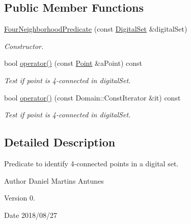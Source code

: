 \subsection*{Public Member Functions}
\begin{DoxyCompactItemize}
\item 
\hyperlink{classDIPaCUS_1_1Neighborhood_1_1FourNeighborhoodPredicate_a97e3418e93f5bb89fcc5fd331c8f6bc6}{Four\+Neighborhood\+Predicate} (const \hyperlink{classDIPaCUS_1_1Neighborhood_1_1FourNeighborhoodPredicate_a9f81af73dae8303b1142e9ca6930c332}{Digital\+Set} \&digital\+Set)
\begin{DoxyCompactList}\small\item\em Constructor. \end{DoxyCompactList}\item 
bool \hyperlink{classDIPaCUS_1_1Neighborhood_1_1FourNeighborhoodPredicate_ab5532db7f4278ee6b107d2ee4eeb385f}{operator()} (const \hyperlink{classDIPaCUS_1_1Neighborhood_1_1FourNeighborhoodPredicate_a5b162b7df8bf69ab1255dbee48de3298}{Point} \&a\+Point) const
\begin{DoxyCompactList}\small\item\em Test if point is 4-\/connected in digital\+Set. \end{DoxyCompactList}\item 
bool \hyperlink{classDIPaCUS_1_1Neighborhood_1_1FourNeighborhoodPredicate_a77275b997027b69409b86cff2bd36279}{operator()} (const Domain\+::\+Const\+Iterator \&it) const
\begin{DoxyCompactList}\small\item\em Test if point is 4-\/connected in digital\+Set. \end{DoxyCompactList}\end{DoxyCompactItemize}


\subsection{Detailed Description}
Predicate to identify 4-\/connected points in a digital set. 

\begin{DoxyAuthor}{Author}
Daniel Martins Antunes 
\end{DoxyAuthor}
\begin{DoxyVersion}{Version}
0. 
\end{DoxyVersion}
\begin{DoxyDate}{Date}
2018/08/27 
\end{DoxyDate}



